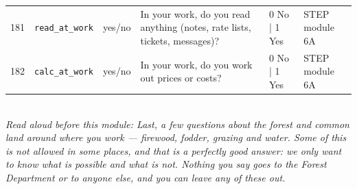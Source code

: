 \documentclass[9pt,a4paper,landscape]{article}
\begin{document}
\begin{longtable}{@{}p{0.5cm}p{3.3cm}p{1.7cm}p{7.3cm}p{5.6cm}p{5.4cm}@{}}
\footnotesize 181 & \footnotesize\texttt{read\_at\_work} & \scriptsize yes/no & \footnotesize In your work, do you read anything (notes, rate lists, tickets, messages)?\par\vspace{1pt}{\footnotesize\color{hdr}{\hifont अपने काम में क्या आप कुछ पढ़ते हैं (पर्ची, रेट लिस्ट, टिकट, मैसेज)?}} & \scriptsize 0 No | 1 Yes & \scriptsize STEP module 6A\\
\footnotesize 182 & \footnotesize\texttt{calc\_at\_work} & \scriptsize yes/no & \footnotesize In your work, do you work out prices or costs?\par\vspace{1pt}{\footnotesize\color{hdr}{\hifont अपने काम में क्या आप दाम या ख़र्चा जोड़ते-घटाते हैं?}} & \scriptsize 0 No | 1 Yes & \scriptsize STEP module 6A\\
\bottomrule\end{longtable}\vspace{6pt}
\\[3pt]
{\small\itshape Read aloud before this module: Last, a few questions about the forest and common land around where you work — firewood, fodder, grazing and water. Some of this is not allowed in some places, and that is a perfectly good answer: we only want to know what is possible and what is not. Nothing you say goes to the Forest Department or to anyone else, and you can leave any of these out.}\\[5pt]
\end{document}
